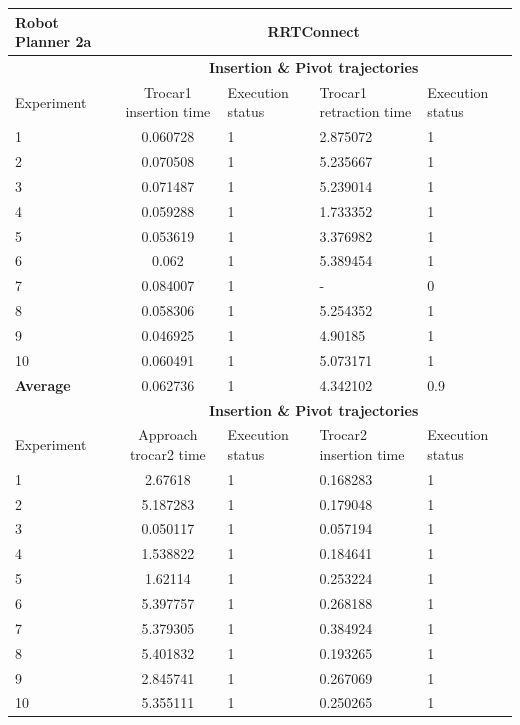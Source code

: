 \begin{longtable}{|p{2cm}|c|p{2cm}|p{2cm}|p{2cm}|}
\hline
Robot Planner 2a           & \multicolumn{4}{c}{\textbf{RRTConnect}}                                                                                                 \vline \\
\hline
                          & \multicolumn{4}{c}{\textbf{Insertion \& Pivot trajectories}}                     \vline \\
\hline
Experiment                & Trocar1 insertion time & Execution status & Trocar1 retraction time & Execution status  \\
\hline
1	& 0.060728	& 1	& 2.875072	& 1 \\
2	& 0.070508	& 1	& 5.235667	& 1 \\
3	& 0.071487	& 1	& 5.239014	& 1 \\
4	& 0.059288	& 1	& 1.733352	& 1 \\
5	& 0.053619	& 1	& 3.376982	& 1 \\
6	& 0.062	& 1	& 5.389454	& 1 \\
7	& 0.084007	& 1	& -	& 0 \\
8	& 0.058306	& 1	& 5.254352	& 1 \\
9	& 0.046925	& 1	& 4.90185	& 1 \\
10	& 0.060491	& 1	& 5.073171	& 1 \\
\hline
\textbf{Average} & 	0.062736	& 1	& 4.342102	& 0.9 \\
\hline
                          & \multicolumn{4}{c}{\textbf{Insertion \& Pivot trajectories}}                     \vline \\
\hline
Experiment                & Approach trocar2 time & Execution status & Trocar2 insertion time & Execution status  \\
\hline
1 & 2.67618	& 1	& 0.168283	& 1 \\
2 & 5.187283	& 1	& 0.179048	& 1 \\
3 & 0.050117	& 1	& 0.057194	& 1 \\
4 & 1.538822	& 1	& 0.184641	& 1 \\
5 & 1.62114	& 1	& 0.253224	& 1 \\
6 & 5.397757	& 1	& 0.268188	& 1 \\
7 & 5.379305	& 1	& 0.384924	& 1 \\
8 & 5.401832	& 1	& 0.193265	& 1 \\
9 & 2.845741	& 1	& 0.267069	& 1 \\
10  & 5.355111	& 1	& 0.250265	& 1 \\

\end{longtable}
